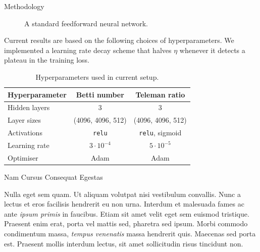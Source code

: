 \documentclass[final,20pt]{beamer}
\newlength{\colwidth}
\begin{document}
\begin{frame}[t]
\begin{columns}[t]
\begin{column}{\colwidth}
\begin{block}{Methodology}
\begin{figure}
      \caption{A standard feedforward neural network.}
    \end{figure}

    Current results are based on the following choices of hyperparameters.
    We implemented a learning rate decay scheme that halves $\eta$
    whenever it detects a plateau in the training loss.

    \begin{table}
      \centering
      \begin{tabular}{lcc}
        \toprule
        Hyperparameter & Betti number & Teleman ratio\\
        \midrule
        Hidden layers                     & 3                 & 3\\
        Layer sizes                       & (4096, 4096, 512) & (4096, 4096, 512)\\
        Activations              & {\tt{relu}}       & {\tt{relu}}, sigmoid\\
        Learning rate             & $3 \cdot 10^{-4}$ & $5 \cdot 10^{-5}$\\
        Optimiser                         & Adam              & Adam\\
        \bottomrule
      \end{tabular}
      \caption{Hyperparameters used in current setup.}
    \end{table}


  \end{block}

  \begin{block}{Nam Cursus Consequat Egestas}

    Nulla eget sem quam. Ut aliquam volutpat nisi vestibulum convallis. Nunc a
    lectus et eros facilisis hendrerit eu non urna. Interdum et malesuada fames
    ac ante \textit{ipsum primis} in faucibus. Etiam sit amet velit eget sem
    euismod tristique. Praesent enim erat, porta vel mattis sed, pharetra sed
    ipsum. Morbi commodo condimentum massa, \textit{tempus venenatis} massa
    hendrerit quis. Maecenas sed porta est. Praesent mollis interdum lectus,
    sit amet sollicitudin risus tincidunt non.


\end{block}
\end{column}
\end{columns}
\end{frame}
\end{document}
